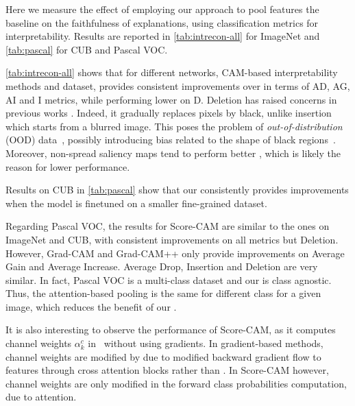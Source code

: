Here we measure the effect of employing our \Ours approach to pool features \vs the baseline \gap on the faithfulness of explanations, using classification metrics for interpretability. Results are reported in \autoref{tab:intrecon-all} for ImageNet and  \autoref{tab:pascal} for CUB and Pascal VOC.

\autoref{tab:intrecon-all} shows that for different networks, CAM-based interpretability methods and dataset, \Ours provides consistent improvements over \gap in terms of AD, AG, AI and I metrics, while performing lower on D. 
%
Deletion has raised concerns in previous works \cite{chefer2021transformer, zhang2023opti}. Indeed, it gradually replaces pixels by black, unlike insertion which starts from a blurred image. This poses the problem of \emph{out-of-distribution} (OOD) data~\cite{gomez2022metrics, hase2021outofdistribution, qiu2021resisting}, possibly introducing bias related to the shape of black regions~\cite{rong2022consistent}. Moreover, non-spread saliency maps tend to perform better \cite{zhang2023opti}, which is likely the reason for lower performance. %


Results on CUB in \autoref{tab:pascal} show that our \Ours consistently provides improvements when the model is finetuned on a smaller fine-grained dataset.

Regarding Pascal VOC, the results for Score-CAM are similar to the ones on ImageNet and CUB, with consistent improvements on all metrics but Deletion. 
However, Grad-CAM and Grad-CAM++ only provide improvements on Average Gain and Average Increase. Average Drop, Insertion and Deletion are very similar.
In fact, Pascal VOC is a multi-class dataset and  our \Ours is class agnostic. Thus, the attention-based pooling is the same for different class for a given image, which reduces the benefit of our \Ours.

It is also interesting to observe the performance of Score-CAM, as it computes channel weights $\alpha_k^c$ in~ without using gradients. 
In gradient-based methods, channel weights are modified by \Ours due to modified backward gradient flow to features through cross attention blocks rather than \gap.
In Score-CAM however, channel weights are only modified in the forward class probabilities computation, due to attention.

